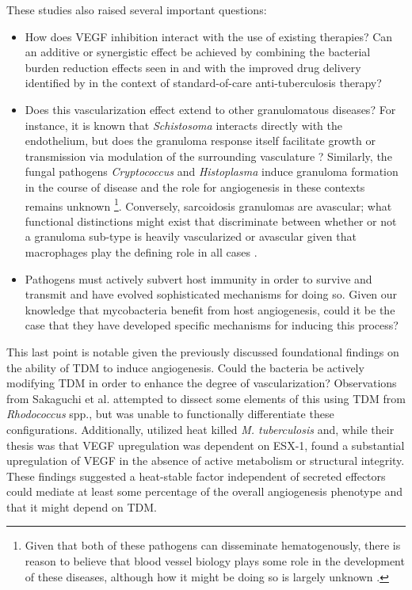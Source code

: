 These studies also raised several important questions:

\begin{itemize}
\item How does VEGF inhibition interact with the use of existing therapies? Can an additive or synergistic effect be achieved by combining the bacterial burden reduction effects seen in \citet{Oehlers2015} and \citet{Polena2016} with the improved drug delivery identified by \citet{Datta2015} in the context of standard\hyp{}of\hyp{}care anti\hyp{}tuberculosis therapy?
\item Does this vascularization effect extend to other granulomatous diseases? For instance, it is known that \textit{Schistosoma} interacts directly with the endothelium, but does the granuloma response itself facilitate growth or transmission via modulation of the surrounding vasculature \citep{Chaves1966, Shariati2011, Pereira2013}? Similarly, the fungal pathogens \textit{Cryptococcus} and \textit{Histoplasma} induce granuloma formation in the course of disease and the role for angiogenesis in these contexts remains unknown \citep{Coenjaerts2004, Martidis1999}\footnote{Given that both of these pathogens can disseminate hematogenously, there is reason to believe that blood vessel biology plays some role in the development of these diseases, although how it might be doing so is largely unknown \citep{Kauffman2007}.}. Conversely, sarcoidosis granulomas are avascular; what functional distinctions might exist that discriminate between whether or not a granuloma sub\hyp{}type is heavily vascularized or avascular given that macrophages play the defining role in all cases \citep{Kambouchner2011}.
\item Pathogens must actively subvert host immunity in order to survive and transmit and have evolved sophisticated mechanisms for doing so. Given our knowledge that mycobacteria benefit from host angiogenesis, could it be the case that they have developed specific mechanisms for inducing this process? 
\end{itemize}

This last point is notable given the previously discussed foundational findings on the ability of TDM to induce angiogenesis. Could the bacteria be actively modifying TDM in order to enhance the degree of vascularization? Observations from Sakaguchi et al. attempted to dissect some elements of this using TDM from \textit{Rhodococcus} spp., but was unable to functionally differentiate these configurations. Additionally, \citeauthor{Polena2016} utilized heat killed \textit{M. tuberculosis} and, while their thesis was that VEGF upregulation was dependent on ESX\hyp{}1, found a substantial upregulation of VEGF in the absence of active metabolism or structural integrity. These findings suggested a heat\hyp{}stable factor independent of secreted effectors could mediate at least some percentage of the overall angiogenesis phenotype and that it might depend on TDM.

